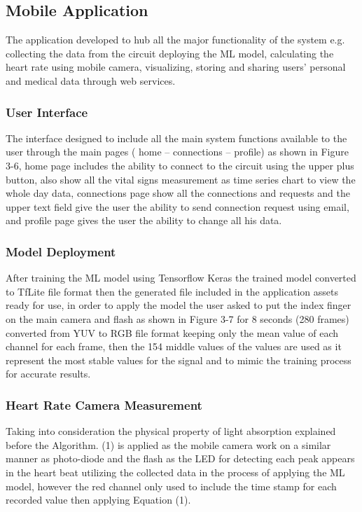 \documentclass{bmcart}
\begin{document}

\subsection*{Mobile Application}
The application developed to hub all the major functionality of the system e.g.
collecting the data from the circuit deploying the ML model, calculating the
heart rate using mobile camera, visualizing, storing and sharing users' personal
and medical data through web services.
\subsubsection*{User Interface}
The interface designed to include all the main system functions available to the
user through the main pages ( home – connections – profile) as shown in Figure
3-6, home page includes the ability to connect to the circuit using the upper
plus button, also show all the vital signs measurement  as time series chart to
view the whole day  data, connections page show all the connections and requests
and the upper text field give the user the ability  to send connection request
using email, and profile page gives the user the ability to change all his data.
\subsubsection*{Model Deployment}
After training the ML model using Tensorflow Keras the trained model converted
to TfLite file format then the generated file included in the application assets
ready for use, in order to apply the model the user asked to put the index
finger on the main camera and flash as shown in Figure 3-7 for 8 seconds (280
frames) converted from YUV to RGB file format keeping only the mean value of
each channel for each frame, then the 154 middle values of the values are used
as it represent the most stable values for the signal and  to mimic the training
process for accurate results.
\subsubsection*{Heart Rate Camera Measurement}
Taking into consideration the physical property of light absorption explained
before the Algorithm. (1)  is applied as the mobile camera work on a similar
manner as photo-diode and the flash as the LED for detecting each peak appears
in the heart beat utilizing the collected data in the process of applying the ML
model, however the red channel only used to include the time stamp for each
recorded value then applying Equation (1). 
\end{document}
